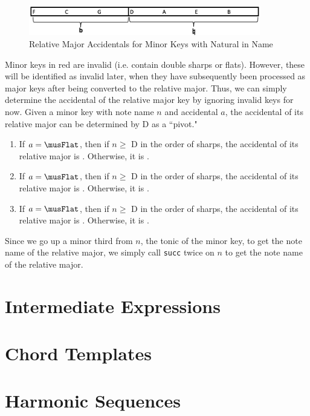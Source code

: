 \documentclass{report}
\begin{document}
\begin{figure}[h!]
\centering
\includegraphics[width=0.9\textwidth]{images/natural_min_to_maj}
\caption{Relative Major Accidentals for Minor Keys with Natural in Name}
\label{major_flat}
\end{figure}

Minor keys in red are invalid (i.e. contain double sharps or flats). However, these will be identified as invalid later, when they have subsequently been processed as major keys after being converted to the relative major. Thus, we can simply determine the accidental of the relative major key by ignoring invalid keys for now. Given a minor key with note name $n$ and accidental $a$, the accidental of its relative major can be determined by D as a ``pivot." 

\begin{enumerate}
\item If $a=\musFlat$, then if $n \geq$ D in the order of sharps, the accidental of its relative major is \musSharp. Otherwise, it is \musNatural.
\item If $a=\musFlat$, then if $n \geq$ D in the order of sharps, the accidental of its relative major is \musFlat. Otherwise, it is \musDoubleFlat.
\item If $a=\musFlat$, then if $n \geq$ D in the order of sharps, the accidental of its relative major is \musNatural. Otherwise, it is \musFlat.
\end{enumerate}

Since we go up a minor third from $n$, the tonic of the minor key, to get  the note name of the relative major, we simply call \verb.succ. twice on $n$ to get the note name of the relative major.

\section{Intermediate Expressions}
\label{sec:irexpr}

\section{Chord Templates}
\section{Harmonic Sequences}
\end{document}
